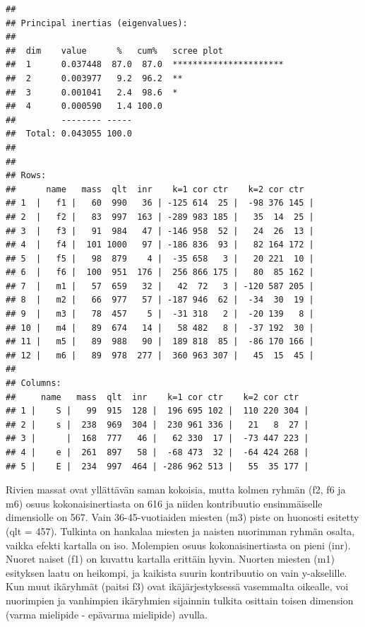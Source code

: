 \documentclass[
  finnish,
]{book}
\begin{document}
\begin{verbatim}
## 
## Principal inertias (eigenvalues):
## 
##  dim    value      %   cum%   scree plot               
##  1      0.037448  87.0  87.0  **********************   
##  2      0.003977   9.2  96.2  **                       
##  3      0.001041   2.4  98.6  *                        
##  4      0.000590   1.4 100.0                           
##         -------- -----                                 
##  Total: 0.043055 100.0                                 
## 
## 
## Rows:
##      name   mass  qlt  inr    k=1 cor ctr    k=2 cor ctr  
## 1  |   f1 |   60  990   36 | -125 614  25 |  -98 376 145 |
## 2  |   f2 |   83  997  163 | -289 983 185 |   35  14  25 |
## 3  |   f3 |   91  984   47 | -146 958  52 |   24  26  13 |
## 4  |   f4 |  101 1000   97 | -186 836  93 |   82 164 172 |
## 5  |   f5 |   98  879    4 |  -35 658   3 |   20 221  10 |
## 6  |   f6 |  100  951  176 |  256 866 175 |   80  85 162 |
## 7  |   m1 |   57  659   32 |   42  72   3 | -120 587 205 |
## 8  |   m2 |   66  977   57 | -187 946  62 |  -34  30  19 |
## 9  |   m3 |   78  457    5 |  -31 318   2 |  -20 139   8 |
## 10 |   m4 |   89  674   14 |   58 482   8 |  -37 192  30 |
## 11 |   m5 |   89  988   90 |  189 818  85 |  -86 170 166 |
## 12 |   m6 |   89  978  277 |  360 963 307 |   45  15  45 |
## 
## Columns:
##     name   mass  qlt  inr    k=1 cor ctr    k=2 cor ctr  
## 1 |    S |   99  915  128 |  196 695 102 |  110 220 304 |
## 2 |    s |  238  969  304 |  230 961 336 |   21   8  27 |
## 3 |      |  168  777   46 |   62 330  17 |  -73 447 223 |
## 4 |    e |  261  897   58 |  -68 473  32 |  -64 424 268 |
## 5 |    E |  234  997  464 | -286 962 513 |   55  35 177 |
\end{verbatim}

Rivien massat ovat yllättävän saman kokoisia, mutta kolmen ryhmän (f2, f6 ja m6)
osuus kokonaisinertiasta on 616 ja niiden kontribuutio ensimmäiselle dimensiolle
on 567. Vain 36-45-vuotiaiden miesten (m3) piste on huonosti esitetty (qlt = 457).
Tulkinta on hankalaa miesten ja naisten nuorimman ryhmän osalta, vaikka efekti
kartalla on iso. Molempien osuus kokonaisinertiasta on pieni (inr). Nuoret naiset
(f1) on kuvattu kartalla erittäin hyvin. Nuorten miesten (m1) esityksen laatu
on heikompi, ja kaikista suurin kontribuutio on vain y-akselille. Kun muut
ikäryhmät (paitsi f3) ovat ikäjärjestyksessä vasemmalta oikealle, voi nuorimpien
ja vanhimpien ikäryhmien sijainnin tulkita osittain toisen dimension (varma
mielipide - epävarma mielipide) avulla.
\end{document}
